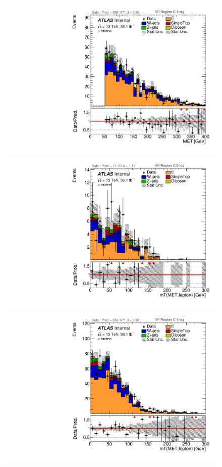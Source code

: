 \begin{figure}[!htbp]
\begin{center}
\includegraphics[scale=0.33]{./figures/boosted/ABCD_ScaledPrompt/muon_SR_RegionC_1tag_MET}   \\
\includegraphics[scale=0.33]{./figures/boosted/ABCD_ScaledPrompt/muon_SR_RegionC_WlepMtATLAS} 
\includegraphics[scale=0.33]{./figures/boosted/ABCD_ScaledPrompt/muon_SR_RegionC_1tag_WlepMtATLAS}\\

\end{center}
\end{figure}
